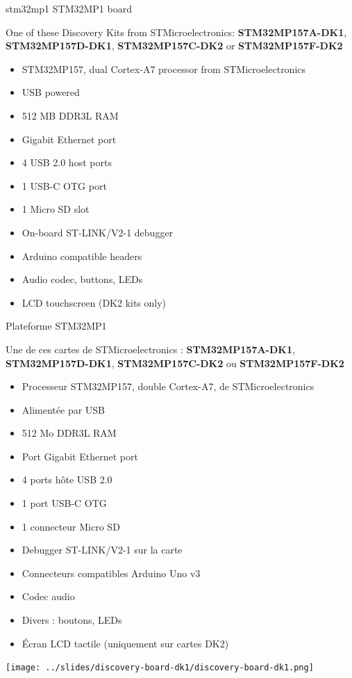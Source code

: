 {stm32mp1}
{STM32MP1 board}
{
  One of these Discovery Kits from STMicroelectronics: {\bf
  STM32MP157A-DK1}, {\bf STM32MP157D-DK1}, {\bf STM32MP157C-DK2} or
  {\bf STM32MP157F-DK2}
  \vspace{0.5cm}
  \begin{itemize}
  \item STM32MP157, dual Cortex-A7 processor from STMicroelectronics
  \item USB powered
  \item 512 MB DDR3L RAM
  \item Gigabit Ethernet port
  \item 4 USB 2.0 host ports
  \item 1 USB-C OTG port
  \item 1 Micro SD slot
  \item On-board ST-LINK/V2-1 debugger
  \item Arduino compatible headers
  \item Audio codec, buttons, LEDs
  \item LCD touchscreen (DK2 kits only)
  \vspace{-0.7cm}
  \end{itemize}
}
{Plateforme STM32MP1}
{
  Une de ces cartes de STMicroelectronics : {\bf
  STM32MP157A-DK1}, {\bf STM32MP157D-DK1}, {\bf STM32MP157C-DK2} ou
  {\bf STM32MP157F-DK2}
  \vspace{0.5cm}
  \begin{itemize}
  \item Processeur STM32MP157, double Cortex-A7, de STMicroelectronics
  \item Alimentée par USB
  \item 512 Mo DDR3L RAM
  \item Port Gigabit Ethernet port
  \item 4 ports hôte USB 2.0
  \item 1 port USB-C OTG
  \item 1 connecteur Micro SD
  \item Debugger ST-LINK/V2-1 sur la carte
  \item Connecteurs compatibles Arduino Uno v3
  \item Codec audio
  \item Divers : boutons, LEDs
  \item Écran LCD tactile (uniquement sur cartes DK2)
  \vspace{-0.7cm}
  \end{itemize}
}
{
  \begin{center}
    \texttt{[image: ../slides/discovery-board-dk1/discovery-board-dk1.png]}
  \end{center}
}

